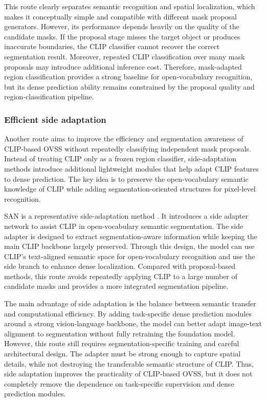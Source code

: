 This route clearly separates semantic recognition and spatial localization, which makes it conceptually simple and compatible with different mask proposal generators. 
However, its performance depends heavily on the quality of the candidate masks. 
If the proposal stage misses the target object or produces inaccurate boundaries, the CLIP classifier cannot recover the correct segmentation result. 
Moreover, repeated CLIP classification over many mask proposals may introduce additional inference cost. 
Therefore, mask-adapted region classification provides a strong baseline for open-vocabulary recognition, but its dense prediction ability remains constrained by the proposal quality and region-classification pipeline.

\subsubsection{Efficient side adaptation}

Another route aims to improve the efficiency and segmentation awareness of CLIP-based OVSS without repeatedly classifying independent mask proposals. 
Instead of treating CLIP only as a frozen region classifier, side-adaptation methods introduce additional lightweight modules that help adapt CLIP features to dense prediction. 
The key idea is to preserve the open-vocabulary semantic knowledge of CLIP while adding segmentation-oriented structures for pixel-level recognition.

SAN is a representative side-adaptation method \cite{Xu2023b}. 
It introduces a side adapter network to assist CLIP in open-vocabulary semantic segmentation. 
The side adapter is designed to extract segmentation-aware information while keeping the main CLIP backbone largely preserved. 
Through this design, the model can use CLIP's text-aligned semantic space for open-vocabulary recognition and use the side branch to enhance dense localization. 
Compared with proposal-based methods, this route avoids repeatedly applying CLIP to a large number of candidate masks and provides a more integrated segmentation pipeline.

The main advantage of side adaptation is the balance between semantic transfer and computational efficiency. 
By adding task-specific dense prediction modules around a strong vision-language backbone, the model can better adapt image-text alignment to segmentation without fully retraining the foundation model. 
However, this route still requires segmentation-specific training and careful architectural design. 
The adapter must be strong enough to capture spatial details, while not destroying the transferable semantic structure of CLIP. 
Thus, side adaptation improves the practicality of CLIP-based OVSS, but it does not completely remove the dependence on task-specific supervision and dense prediction modules.

